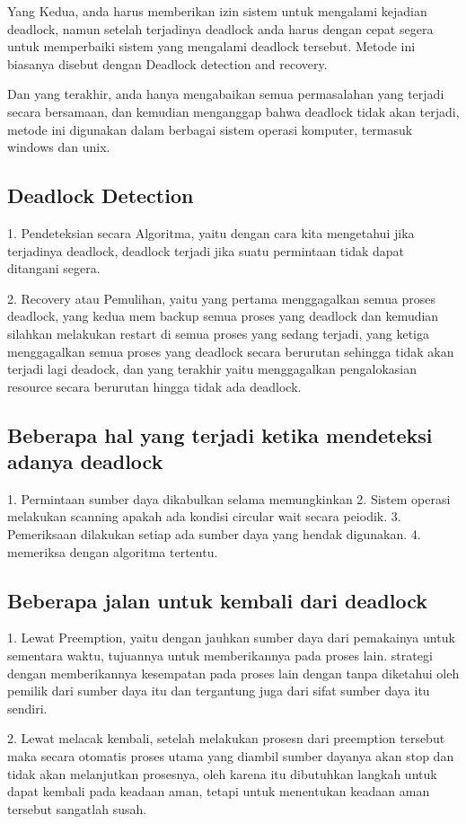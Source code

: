 	Yang Kedua, anda harus memberikan izin sistem untuk mengalami kejadian deadlock, namun setelah terjadinya deadlock anda harus dengan cepat segera untuk memperbaiki sistem yang mengalami deadlock tersebut. Metode ini biasanya disebut dengan Deadlock detection and recovery.
	
	Dan yang terakhir, anda hanya mengabaikan semua permasalahan yang terjadi secara bersamaan, dan kemudian menganggap bahwa deadlock tidak akan terjadi, metode ini digunakan dalam berbagai sistem operasi komputer, termasuk windows dan unix.
	
	
\subsection {Deadlock Detection}
	1. Pendeteksian secara Algoritma, yaitu dengan cara kita mengetahui jika terjadinya deadlock, deadlock terjadi jika suatu permintaan tidak dapat ditangani segera.
	
	2. Recovery atau Pemulihan, yaitu yang pertama menggagalkan semua proses deadlock, yang kedua mem backup semua proses yang deadlock dan kemudian silahkan melakukan restart di semua proses yang sedang terjadi, yang ketiga menggagalkan semua proses yang deadlock secara berurutan sehingga tidak akan terjadi lagi deadock, dan yang terakhir yaitu menggagalkan pengalokasian resource secara berurutan hingga tidak ada deadlock.
	
\subsection {Beberapa hal yang terjadi ketika mendeteksi adanya deadlock}
	1. Permintaan sumber daya dikabulkan selama memungkinkan
	2. Sistem operasi melakukan scanning apakah ada kondisi circular wait secara peiodik.
	3. Pemeriksaan dilakukan setiap ada sumber daya yang hendak digunakan.
	4. memeriksa dengan algoritma tertentu.
	
\subsection {Beberapa jalan untuk kembali dari deadlock}
	1. Lewat Preemption, yaitu dengan jauhkan sumber daya dari pemakainya untuk sementara waktu, tujuannya untuk memberikannya pada proses lain. strategi dengan memberikannya kesempatan pada proses lain dengan tanpa diketahui oleh pemilik dari sumber daya itu dan tergantung juga dari sifat sumber daya itu sendiri.
	
	2. Lewat melacak kembali, setelah melakukan prosesn dari preemption tersebut maka secara otomatis proses utama yang diambil sumber dayanya akan stop dan tidak akan melanjutkan prosesnya, oleh karena itu dibutuhkan langkah untuk dapat kembali pada keadaan aman, tetapi untuk menentukan keadaan aman tersebut sangatlah susah.
	
